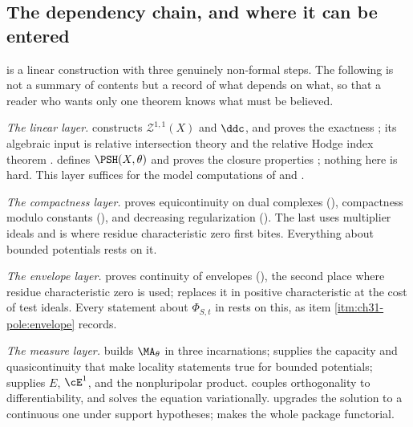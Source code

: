 \subsection{The dependency chain, and where it can be entered}
\label{sec:ch31-dependency}

 is a linear construction with three genuinely
non-formal steps.  The following is not a summary of contents but a record
of what depends on what, so that a reader who wants only one theorem knows
what must be believed.

\emph{The linear layer.}   constructs
\(\mathcal Z^{1,1}(X)\) and \(\ddc\), and proves the exactness
; its algebraic input is relative intersection
theory and the relative Hodge index theorem
.   defines
\(\PSH(X,\theta)\) and proves the closure properties
; nothing here is hard.  This layer suffices for
the model computations of  and
.

\emph{The compactness layer.}   proves
equicontinuity on dual complexes
(), compactness modulo constants
(), and decreasing regularization
().  The last uses multiplier
ideals and is where residue characteristic zero first bites.  Everything
about bounded potentials rests on it.

\emph{The envelope layer.}   proves continuity of
envelopes (), the second place where
residue characteristic zero is used; 
replaces it in positive characteristic at the cost of test ideals.  Every
statement about \(\Phi_{S,t}\) in  rests on this,
as item \cref{itm:ch31-pole:envelope} records.

\emph{The measure layer.}   builds \(\MA_\theta\) in three
incarnations;  supplies the capacity and
quasicontinuity that make locality statements true for bounded potentials;
 supplies \(E\), \(\cE^1\), and the nonpluripolar
product.   couples orthogonality to
differentiability, and  solves the
equation variationally.   upgrades the solution to
a continuous one under support hypotheses;
 makes the whole package functorial.

